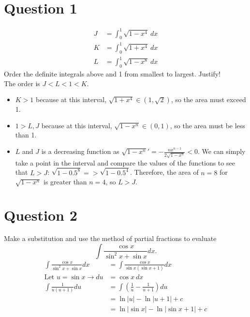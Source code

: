 \documentclass{article}
\begin{document}
\newcommand{\documentcourse}{MATH1851}
\newcommand{\documentnumber}{3}





\section*{Question 1}
\begin{align*}
    J & =\int_0^1\sqrt{1-x^4}\:dx \\K&=\int_0^1\sqrt{1+x^4}\:dx\\L&=\int_0^1\sqrt{1-x^8}\:dx
\end{align*}
Order the definite integrals above and 1 from smallest to largest. Justify!
\\
The order is $J < L < 1 < K$.
\begin{itemize}
    \item $K > 1$ because at this interval, $\sqrt{1+x^4} \in (1,\sqrt{2})$, so the area must exceed 1.
    \item $1 > L, J$ because at this interval, $\sqrt{1-x^n} \in (0,1)$, so the area must be less than 1.
    \item $L$ and $J$ is a decreasing function as $\sqrt{1-x^n}' = -\frac{nx^{n-1}}{2\sqrt{1-x^n}} < 0$. We can simply take a point in the interval and compare the values of the functions to see that $L > J$: $\sqrt{1-0.5^8} =  > \sqrt{1-0.5^4}$. Therefore, the area of $n=8$ for $\sqrt{1-x^n}$ is greater than $n=4$, so $L > J$.
\end{itemize}

\section*{Question 2}
Make a substitution and use the method of partial fractions to evaluate
\[\int\frac{\cos x}{\sin^2x+\sin x}dx.\]
\begin{align*}
    \int\frac{\cos x}{\sin^2x+\sin x}dx & =\int\frac{\cos x}{\sin x(\sin x+1)}dx \\
    \text{Let }u=\sin x \rightarrow du  & =\cos x\:dx                            \\
    \int\frac{1}{u(u+1)}du              & =\int(\frac{1}{u}-\frac{1}{u+1})du     \\
                                        & =\ln|u|-\ln|u+1|+c                     \\
                                        & =\ln|\sin x|-\ln|\sin x+1|+c
\end{align*}
\end{document}

